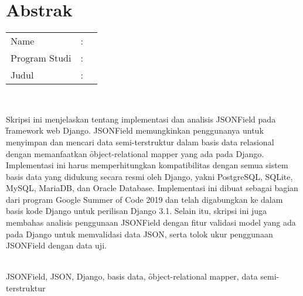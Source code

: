 %
%
%

\chapter*{Abstrak}
\singlespacing

\vspace*{0.2cm}

\noindent \begin{tabular}{l l p{10cm}}
	Name&: & \penulis \\
	Program Studi&: & \programIndonesia \\
	Judul&: & \judulIndonesia \\
\end{tabular} \\

\vspace*{0.5cm}

\noindent
Skripsi ini menjelaskan tentang implementasi dan analisis JSONField pada
\f{framework} web Django. JSONField memungkinkan penggunanya untuk menyimpan
dan mencari data semi-terstruktur dalam basis data relasional dengan
memanfaatkan \f{object-relational mapper} yang ada pada Django. Implementasi
ini harus memperhitungkan kompatibilitas dengan semua sistem basis data yang
didukung secara resmi oleh Django, yakni PostgreSQL, SQLite, MySQL, MariaDB,
dan Oracle Database. Implementasi ini dibuat sebagai bagian dari program Google
Summer of Code 2019 dan telah digabungkan ke dalam basis kode Django untuk
perilisan Django 3.1. Selain itu, skripsi ini juga membahas analisis penggunaan
JSONField dengan fitur validasi model yang ada pada Django untuk memvalidasi
data JSON, serta tolok ukur penggunaan JSONField dengan data uji. \\

\vspace*{0.2cm}

\noindent {} \\
JSONField, JSON, Django, basis data, \f{object-relational mapper}, data
semi-terstruktur \\

\onehalfspacing
\newpage
